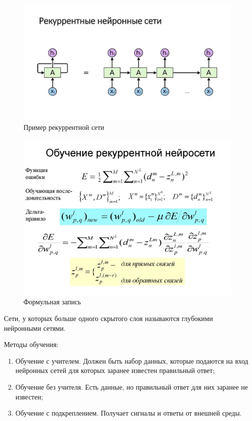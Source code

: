 \documentclass[12pt,a4paper]{report}
\begin{document}
\begin{enumerate}
\begin{figure}
	\centering
	\includegraphics[width=\columnwidth]{rek}
	\caption{Пример рекуррентной сети}
\end{figure}
\begin{figure}
	\centering
	\includegraphics[width=\columnwidth]{rek2}
	\caption{Формульная запись}
\end{figure}

\end{enumerate}

Сети, у которых больше одного скрытого слоя называются глубокими нейронными сетями. 

Методы обучения:
\begin{enumerate}
	\item Обучение с учителем. Должен быть набор данных, которые подаются на вход нейронных сетей для которых заранее известен правильный ответ;
	\item Обучение без учителя. Есть данные, но правильный ответ для них заранее не известен;
	\item Обучение с подкреплением. Получает сигналы и ответы от внешней среды.
\end{enumerate}
\end{document}
